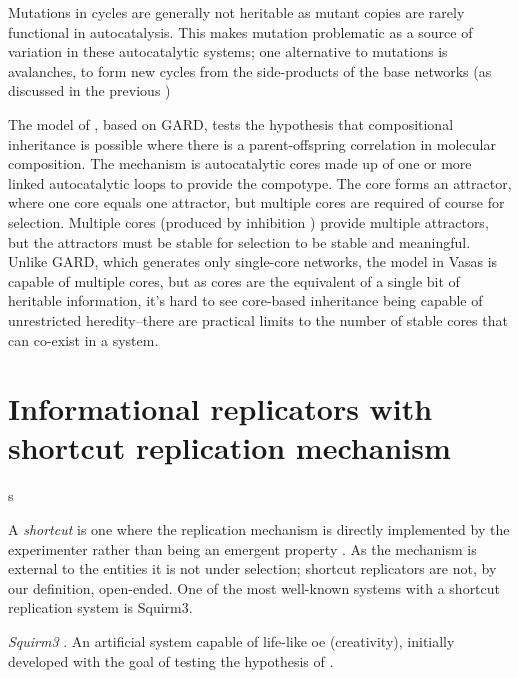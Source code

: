 Mutations in cycles \parencite{Vasas2012a} are generally not heritable as mutant copies are rarely functional in autocatalysis. This makes mutation problematic as a source of variation in these autocatalytic systems; one alternative to mutations is avalanches, to form new cycles from the side-products of the base networks (as discussed in the previous )


The model of \parencite{Vasas2015, Vasas2012, Vasas2012a}, based on GARD, tests the hypothesis that compositional inheritance is possible where there is a parent-offspring correlation in molecular composition. The mechanism is autocatalytic cores made up of one or more linked autocatalytic loops to provide the compotype. The core forms an attractor, where one core equals one attractor, but multiple cores are required of course for selection. Multiple cores (produced by inhibition \textcite{Vasas2012a}) provide multiple attractors, but the attractors must be stable for selection to be stable and meaningful. Unlike GARD, which generates only single-core networks, the model in Vasas is capable of multiple cores, but as cores are the equivalent of a single bit of heritable information, it's hard to see core-based inheritance being capable of unrestricted heredity--there are practical limits to the number of stable cores that can co-exist in a system. 

\section{Informational replicators with shortcut replication mechanism}s

A \emph{shortcut} is one where the replication mechanism is directly implemented by the experimenter rather than being an emergent property \parencite{BanzhafBaumgaertnerBeslonEtAl2016}. As the mechanism is external to the entities it is not under selection; shortcut replicators are not, by our definition, open-ended. One of the most well-known systems with a shortcut replication system is Squirm3.

\emph{Squirm3} \parencite{Hutton2007,Hutton2002}. An artificial system capable of life-like \gls{oe} (creativity), initially developed with the goal of testing the hypothesis of \textcite{Taylor2001} \parencite[p.341]{Hutton2002}.

